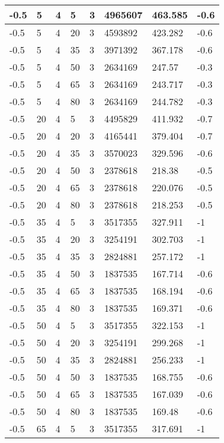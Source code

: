 \begin{longtable}{|p{1.4cm}|p{1.4cm}|p{1.4cm}|p{1.4cm}|p{1.4cm}|p{1.4cm}|p{1.4cm}|p{1.5cm}|}
        -0.5 & 5 & 4 & 5 & 3 & 4965607 & 463.585 & -0.6 \\ \hline
        -0.5 & 5 & 4 & 20 & 3 & 4593892 & 423.282 & -0.6 \\ \hline
        -0.5 & 5 & 4 & 35 & 3 & 3971392 & 367.178 & -0.6 \\ \hline
        -0.5 & 5 & 4 & 50 & 3 & 2634169 & 247.57 & -0.3 \\ \hline
        -0.5 & 5 & 4 & 65 & 3 & 2634169 & 243.717 & -0.3 \\ \hline
        -0.5 & 5 & 4 & 80 & 3 & 2634169 & 244.782 & -0.3 \\ \hline
        -0.5 & 20 & 4 & 5 & 3 & 4495829 & 411.932 & -0.7 \\ \hline
        -0.5 & 20 & 4 & 20 & 3 & 4165441 & 379.404 & -0.7 \\ \hline
        -0.5 & 20 & 4 & 35 & 3 & 3570023 & 329.596 & -0.6 \\ \hline
        -0.5 & 20 & 4 & 50 & 3 & 2378618 & 218.38 & -0.5 \\ \hline
        -0.5 & 20 & 4 & 65 & 3 & 2378618 & 220.076 & -0.5 \\ \hline
        -0.5 & 20 & 4 & 80 & 3 & 2378618 & 218.253 & -0.5 \\ \hline
        -0.5 & 35 & 4 & 5 & 3 & 3517355 & 327.911 & -1 \\ \hline
        -0.5 & 35 & 4 & 20 & 3 & 3254191 & 302.703 & -1 \\ \hline
        -0.5 & 35 & 4 & 35 & 3 & 2824881 & 257.172 & -1 \\ \hline
        -0.5 & 35 & 4 & 50 & 3 & 1837535 & 167.714 & -0.6 \\ \hline
        -0.5 & 35 & 4 & 65 & 3 & 1837535 & 168.194 & -0.6 \\ \hline
        -0.5 & 35 & 4 & 80 & 3 & 1837535 & 169.371 & -0.6 \\ \hline
        -0.5 & 50 & 4 & 5 & 3 & 3517355 & 322.153 & -1 \\ \hline
        -0.5 & 50 & 4 & 20 & 3 & 3254191 & 299.268 & -1 \\ \hline
        -0.5 & 50 & 4 & 35 & 3 & 2824881 & 256.233 & -1 \\ \hline
        -0.5 & 50 & 4 & 50 & 3 & 1837535 & 168.755 & -0.6 \\ \hline
        -0.5 & 50 & 4 & 65 & 3 & 1837535 & 167.039 & -0.6 \\ \hline
        -0.5 & 50 & 4 & 80 & 3 & 1837535 & 169.48 & -0.6 \\ \hline
        -0.5 & 65 & 4 & 5 & 3 & 3517355 & 317.691 & -1 \\ \hline

\end{longtable}
